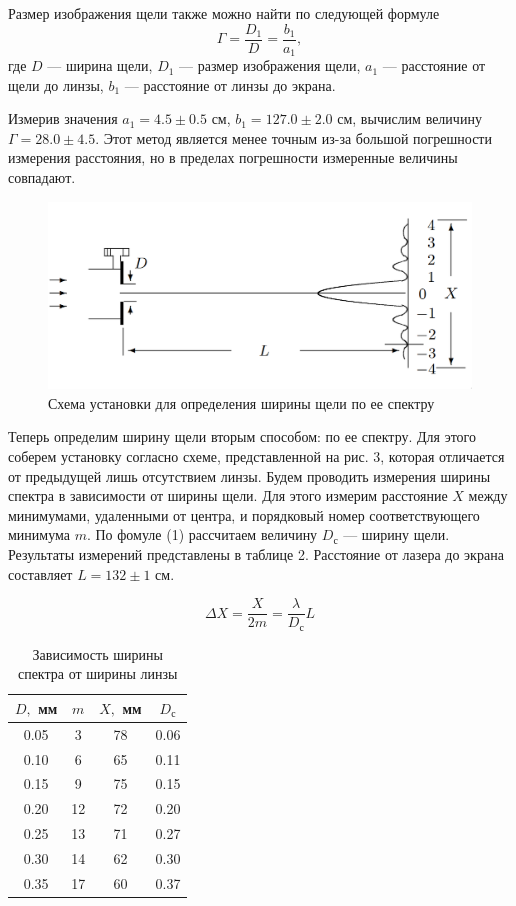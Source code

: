 \documentclass[a4paper,12pt]{article}
\begin{document}
\noindent
Размер изображения щели также можно найти по следующей формуле
\[
    \Gamma = \frac{D_1}{D} = \frac{b_1}{a_1},
\]
где $D$ --- ширина щели, $D_1$ --- размер изображения щели, $a_1$ --- расстояние от щели до линзы, $b_1$ --- расстояние от линзы до экрана.

\noindent
Измерив значения $a_1  = 4.5 \pm 0.5$ см, $b_1 = 127.0 \pm 2.0$ см, вычислим величину $\Gamma = 28.0 \pm 4.5$. Этот метод является менее точным из-за большой погрешности измерения расстояния, но в пределах погрешности измеренные величины совпадают.

\begin{figure}[H]
    \centering
    \includegraphics[scale=0.3]{image_2_.png}
    \caption{Схема установки для определения ширины щели по ее спектру}
\end{figure}

\noindent
Теперь определим ширину щели вторым способом: по ее спектру. Для этого соберем установку согласно схеме, представленной на рис. 3, которая отличается от предыдущей лишь отсутствием линзы. Будем проводить измерения ширины спектра в зависимости от ширины щели. Для этого измерим расстояние $X$ между минимумами, удаленными от центра, и порядковый номер соответствующего минимума $m$. По фомуле (1) рассчитаем величину $D_\text{с}$ --- ширину щели. Результаты измерений представлены в таблице 2. Расстояние от лазера до экрана составляет $L = 132 \pm 1$ см.

\begin{equation}
    \Delta X = \frac{X}{2m} = \frac{\lambda}{D_\text{с}} L
\end{equation}

\begin{table}[H]
    \centering
    \caption{Зависимость ширины спектра от ширины линзы}
    \begin{tabular}{|c|c|c|c|} \hline
        $D,$ мм & $m$ & $X,$ мм & $D_\text{с}$ \\ \hline
        0.05 & 3 & 78 &  0.06 \\ \hline 
        0.10 & 6 & 65 &  0.11 \\ \hline 
        0.15 & 9 & 75 &  0.15 \\ \hline 
        0.20 & 12 & 72 & 0.20 \\ \hline 
        0.25 & 13 & 71 & 0.27 \\ \hline 
        0.30 & 14 & 62 & 0.30 \\ \hline 
        0.35 & 17 & 60 & 0.37 \\ \hline 
    \end{tabular}
\end{table}
\end{document}
